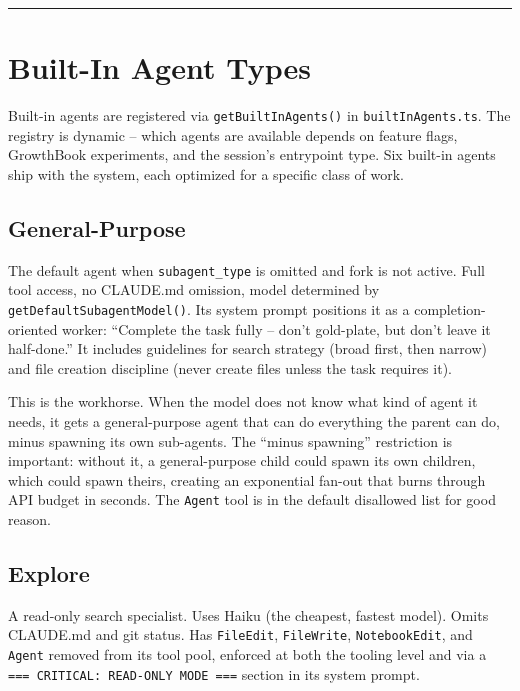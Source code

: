 \documentclass[
  english,
  11pt,
  letterpaper,
]{book}
\begin{document}
\begin{center}\rule{0.5\linewidth}{0.5pt}\end{center}

\section{Built-In Agent Types}\label{built-in-agent-types}

Built-in agents are registered via \texttt{getBuiltInAgents()} in
\texttt{builtInAgents.ts}. The registry is dynamic -- which agents are
available depends on feature flags, GrowthBook experiments, and the
session's entrypoint type. Six built-in agents ship with the system,
each optimized for a specific class of work.

\subsection{General-Purpose}\label{general-purpose}

The default agent when \texttt{subagent\_type} is omitted and fork is
not active. Full tool access, no CLAUDE.md omission, model determined by
\texttt{getDefaultSubagentModel()}. Its system prompt positions it as a
completion-oriented worker: ``Complete the task fully -- don't
gold-plate, but don't leave it half-done.'' It includes guidelines for
search strategy (broad first, then narrow) and file creation discipline
(never create files unless the task requires it).

This is the workhorse. When the model does not know what kind of agent
it needs, it gets a general-purpose agent that can do everything the
parent can do, minus spawning its own sub-agents. The ``minus spawning''
restriction is important: without it, a general-purpose child could
spawn its own children, which could spawn theirs, creating an
exponential fan-out that burns through API budget in seconds. The
\texttt{Agent} tool is in the default disallowed list for good reason.

\subsection{Explore}\label{explore}

A read-only search specialist. Uses Haiku (the cheapest, fastest model).
Omits CLAUDE.md and git status. Has \texttt{FileEdit},
\texttt{FileWrite}, \texttt{NotebookEdit}, and \texttt{Agent} removed
from its tool pool, enforced at both the tooling level and via a
\texttt{===\ CRITICAL:\ READ-ONLY\ MODE\ ===} section in its system
prompt.
\end{document}
